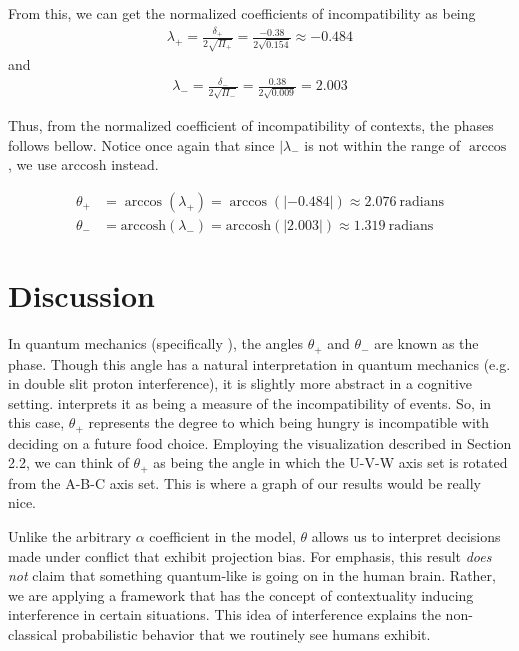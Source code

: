 \documentclass[12pt]{article}
\begin{document}
	From this, we can get the normalized coefficients of incompatibility as being
	\begin{align}
	\lambda_{+} = \frac{\delta_{+}}{2 \sqrt{\Pi_{+}}}= \frac{-0.38}{2\sqrt{0.154}} \approx -0.484
	\end{align}
	and 
	\begin{align}
	\lambda_{-} = \frac{\delta_{-}}{2 \sqrt{\Pi_{-}}}= \frac{0.38}{2\sqrt{0.009}} = 2.003
	\end{align}
	 
	Thus, from the normalized coefficient of incompatibility of contexts, the phases follows bellow. Notice once again that since $|\lambda_{-}$ is not within the range of $\arccos$, we use arccosh instead. 
	
	\begin{align}
	\theta_{+} &= \arccos(\lambda_{+}) = \arccos(|-0.484|) \approx 2.076 \  \text{radians} \\
	\theta_{-} &= \text{arccosh}(\lambda_{-}) = \text{arccosh}(|2.003|) \approx 1.319\ \text{radians}
	\end{align}
	
	\section{Discussion}
	
	
	
	In quantum mechanics (specifically \cite{dirac_1930}), the angles $\theta_{+}$ and $\theta_{-}$ are known as the phase. Though this angle has a natural interpretation in quantum mechanics (e.g. in double slit proton interference), it is slightly more abstract in a cognitive setting. \cite{Khrennnikov10} interprets it as being a measure of the incompatibility of events. So, in this case, $\theta_{+}$ represents the degree to which being hungry is incompatible with deciding on a future food choice. Employing the visualization described in Section 2.2, we can think of $\theta_{+}$ as being the angle in which the U-V-W axis set is rotated from the A-B-C axis set. {\sf This is where a graph of our results would be really nice.}
	
	Unlike the arbitrary $\alpha$ coefficient in the \cite{loewenstein_odonoghue_rabin_2003} model, $\theta$ allows us to interpret decisions made under conflict that exhibit projection bias. For emphasis, this result \textit{does not} claim that something quantum-like is going on in the human brain. Rather, we are applying a framework that has the concept of contextuality inducing interference in certain situations. This idea of interference explains the non-classical probabilistic behavior that we routinely see humans exhibit. 	
	
\end{document}
